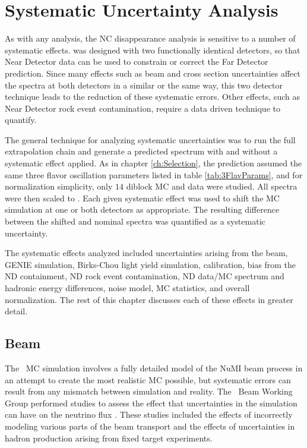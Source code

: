 \chapter{Systematic Uncertainty Analysis}
\label{ch:Systs}

As with any analysis, the NC disappearance analysis is sensitive to a number of systematic effects. \nova\newline\n was designed with two functionally identical detectors, so that Near Detector data can be used to constrain or correct the Far Detector prediction. Since many effects such as beam and cross section uncertainties affect the spectra at both detectors in a similar or the same way, this two detector technique leads to the reduction of these systematic errors. Other effects, such as Near Detector rock event contamination, require a data driven technique to quantify.

The general technique for analyzing systematic uncertainties was to run the full extrapolation chain and generate a predicted spectrum with and without a systematic effect applied. As in chapter \ref{ch:Selection}, the prediction assumed the same three flavor oscillation parameters listed in table \ref{tab:3FlavParams}, and for normalization simplicity, only $14$ diblock MC and data were studied. All spectra were then scaled to . Each given systematic effect was used to shift the MC simulation at one or both detectors as appropriate. The resulting difference between the shifted and nominal spectra was quantified as a systematic uncertainty.

The systematic effects analyzed included uncertainties arising from the beam, GENIE simulation, Birks-Chou light yield simulation, calibration, bias from the ND containment, ND rock event contamination, ND data/MC spectrum and hadronic energy differences, noise model, MC statistics, and overall normalization. The rest of this chapter discusses each of these effects in greater detail.

\section{Beam}
\label{sec:SystBeam}

The \nova~MC simulation involves a fully detailed model of the NuMI beam process in an attempt to create the most realistic MC possible, but systematic errors can result from any mismatch between simulation and reality. The \nova~Beam Working Group performed studies to assess the effect that uncertainties in the simulation can have on the neutrino flux \cite{ref:TNBeam}. These studies included the effects of incorrectly modeling various parts of the beam transport and the effects of uncertainties in hadron production arising from fixed target experiments.

